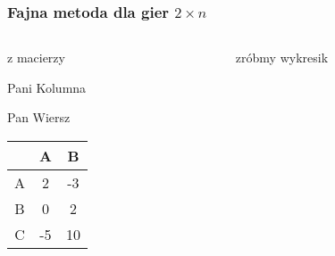 \documentclass[8pt, brown]{beamer}
\begin{document}
		\begin{frame}
			\frametitle{Fajna metoda dla gier $2 \times n$}
			\begin{columns}
				\begin{column}{0.45\textwidth}
					\begin{center}
						\LARGE\color{navyblue}z macierzy
					\end{center}
					\begin{center}
						Pani Kolumna
					\end{center}
					Pan Wiersz
					\begin{tabular}{c|cc}
						  & A  & B   \\ \hline
						A & 2  & -3  \\
						B & 0  & 2   \\
						C & -5 & 10  \\
					\end{tabular}
				\end{column}
				
				\begin{column}{0.45\textwidth}
					\begin{center}
						zróbmy \LARGE\color{orange} wykresik
					\end{center}
				\end{column}
			\end{columns}
		\end{frame}
		
\end{document}

